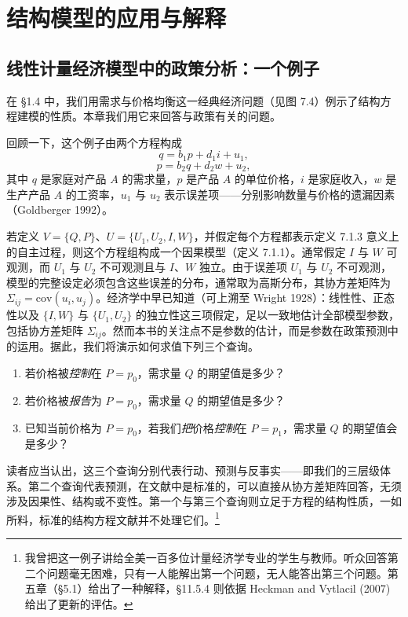 \section{结构模型的应用与解释}

\subsection{线性计量经济模型中的政策分析：一个例子}

在 \S 1.4 中，我们用需求与价格均衡这一经典经济问题（见图 7.4）例示了结构方程建模的性质。本章我们用它来回答与政策有关的问题。

回顾一下，这个例子由两个方程构成
\begin{equation}
q=b_1p+d_1i+u_1, \tag{7.9}
\end{equation}
\begin{equation}
p=b_2q+d_2w+u_2, \tag{7.10}
\end{equation}
其中 $q$ 是家庭对产品 $A$ 的需求量，$p$ 是产品 $A$ 的单位价格，$i$ 是家庭收入，$w$ 是生产产品 $A$ 的工资率，$u_1$ 与 $u_2$ 表示误差项——分别影响数量与价格的遗漏因素（Goldberger 1992）。

若定义 $V=\{Q,P\}$、$U=\{U_1,U_2,I,W\}$，并假定每个方程都表示定义 7.1.3 意义上的自主过程，则这个方程组构成一个因果模型（定义 7.1.1）。通常假定 $I$ 与 $W$ 可观测，而 $U_1$ 与 $U_2$ 不可观测且与 $I$、$W$ 独立。由于误差项 $U_1$ 与 $U_2$ 不可观测，模型的完整设定必须包含这些误差的分布，通常取为高斯分布，其协方差矩阵为 $\Sigma_{ij}=\mathrm{cov}(u_i,u_j)$。经济学中早已知道（可上溯至 Wright 1928）：线性性、正态性以及 $\{I,W\}$ 与 $\{U_1,U_2\}$ 的独立性这三项假定，足以一致地估计全部模型参数，包括协方差矩阵 $\Sigma_{ij}$。然而本书的关注点不是参数的估计，而是参数在政策预测中的运用。据此，我们将演示如何求值下列三个查询。

\begin{enumerate}[label=\arabic*.,leftmargin=1.9em,itemsep=0.3em]
\item 若价格被\emph{控制}在 $P=p_0$，需求量 $Q$ 的期望值是多少？
\item 若价格被\emph{报告}为 $P=p_0$，需求量 $Q$ 的期望值是多少？
\item 已知当前价格为 $P=p_0$，若我们\emph{把}价格\emph{控制}在 $P=p_1$，需求量 $Q$ 的期望值会是多少？
\end{enumerate}

读者应当认出，这三个查询分别代表行动、预测与反事实——即我们的三层级体系。第二个查询代表预测，在文献中是标准的，可以直接从协方差矩阵回答，无须涉及因果性、结构或不变性。第一个与第三个查询则立足于方程的结构性质，一如所料，标准的结构方程文献并不处理它们。\footnote{我曾把这一例子讲给全美一百多位计量经济学专业的学生与教师。听众回答第二个问题毫无困难，只有一人能解出第一个问题，无人能答出第三个问题。第五章（\S 5.1）给出了一种解释，\S 11.5.4 则依据 Heckman and Vytlacil (2007) 给出了更新的评估。}


